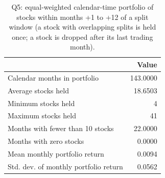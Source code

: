 \begin{table}[!htbp]
\centering
\small
\caption{Q5: equal-weighted calendar-time portfolio of stocks within months +1 to +12 of a split window (a stock with overlapping splits is held once; a stock is dropped after its last trading month).}
\label{tab:q5}
\begin{tabular}{p{9cm}r}
\toprule
 & Value \\
\midrule
Calendar months in portfolio & 143.0000 \\
Average stocks held & 18.6503 \\
Minimum stocks held & 4 \\
Maximum stocks held & 41 \\
Months with fewer than 10 stocks & 22.0000 \\
Months with zero stocks & 0.0000 \\
Mean monthly portfolio return & 0.0094 \\
Std. dev. of monthly portfolio return & 0.0562 \\
\bottomrule
\end{tabular}
\end{table}
